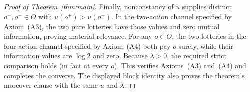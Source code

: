 \begin{proof}[Proof of Theorem~\ref{thm:main}]
Finally, nonconstancy of $u$ supplies distinct $o^+,o^-\in O$ with
$u(o^+)>u(o^-)$.  In the two-action channel specified by
Axiom~\textup{(A3)}, the two pure lotteries have those values and zero mutual
information, proving material relevance.  For any $o\in O$, the two lotteries
in the four-action channel specified by Axiom~\textup{(A4)} both pay $o$
surely, while their information values are $\log2$ and zero.  Because
$\lambda>0$, the required strict comparison holds (in fact at every $o$).
This verifies Axioms~\textup{(A3)} and~\textup{(A4)} and completes the
converse.  The displayed block identity also proves the theorem's moreover
clause with the same $u$ and $\lambda$.
\end{proof}
